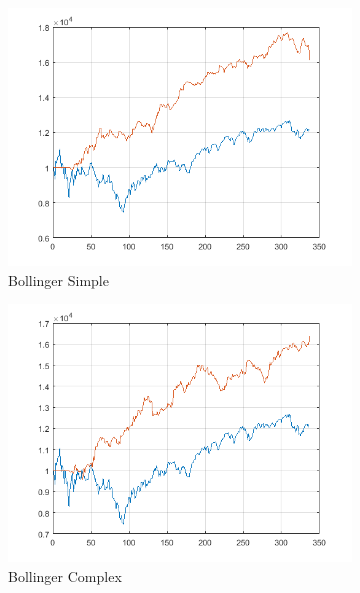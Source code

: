 \documentclass[11pt,a4,twosided,singlespacing,titlepagenumber=on]{scrreprt}
\numberwithin{equation}{chapter} %
\theoremstyle{remark}
\begin{document}
\begin{figure}[H]
    \centering
    \begin{subfigure}[t]{0.32\textwidth}
        \centering
        \includegraphics[width=1\textwidth]{res/strats/simple}
        \caption{Bollinger Simple}
    \end{subfigure}
    \begin{subfigure}[t]{0.32\textwidth}
        \centering
        \includegraphics[width=1\textwidth]{res/strats/complex}
        \caption{Bollinger Complex}
    \end{subfigure}
    \begin{subfigure}[t]{0.32\textwidth}
        \centering

\end{subfigure}
\end{figure}
\end{document}
